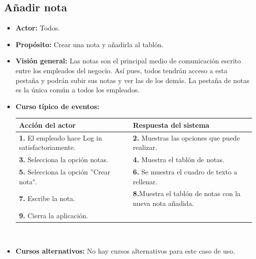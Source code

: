 \documentclass[spanish,a4paper,12pt]{report}	%
\begin{document}
	\subsection{Añadir nota} 
			\begin{itemize}
			\item \textbf{Actor:} Todos.
			\item \textbf{Propósito: } Crear una nota y añadirla al tablón.
			\item \textbf{Visión general:} Las notas son el principal medio de comunicación escrito entre los empleados del negocio. 		Así pues, todos tendrán acceso a esta pestaña y podrán subir sus notas y ver las de los demás. La
pestaña de notas es la única común a todos los empleados.
			\item \textbf{Curso típico de eventos:} 	\\
				\begin{tabular}{|p{6cm}||p{6cm}|}
				\hline
				\textbf{Acción del actor} & \textbf{Respuesta del sistema} \\ \hline \hline
				\textbf{1.}    El empleado hace Log in satisfactoriamente. & \textbf{2.} Muestras las opciones que puede realizar. \\ \hline
				\textbf{3.} Selecciona la opción notas. & \textbf{4.} Muestra el tablón de notas. \\ \hline
				\textbf{5.} Selecciona la opción ''Crear nota".	& \textbf{6.} Se muestra el cuadro de texto a rellenar. \\ \hline
				\textbf{7.} Escribe la nota.	& \textbf{8.}Muestra el tablón de notas con la nueva nota añadida. \\ \hline
				\textbf{9.} Cierra la aplicación. &  \\ \hline
			\end{tabular}
			\\
			\item \textbf{Cursos alternativos:} No hay cursos alternativos para este caso de uso.
		\end {itemize}


\end{document}
